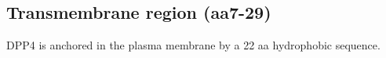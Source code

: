 \subsection{Transmembrane region (aa7-29)}

DPP4 is anchored in the plasma membrane by a 22 aa hydrophobic sequence. 